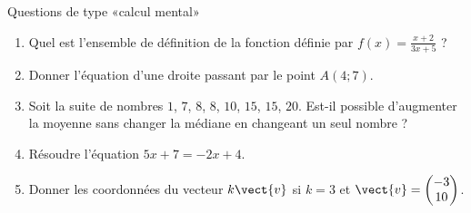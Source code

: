 
\begin{exercice}[\ldots/5]\label{exosmath-0714}

    Questions de type «calcul mental» 
    \begin{multicols}{2}
    \begin{enumerate}
        \item
            Quel est l'ensemble de définition de la fonction définie par \( f(x)=\frac{ x+2 }{ 3x+5 }\) ?
        \item
            Donner l'équation d'une droite passant par le point \( A(4;7)\).
        \item
            Soit la suite de nombres \( 1\), \( 7\), \( 8\), \( 8\), \( 10\), \( 15\), \( 15\), \( 20\). Est-il possible d'augmenter la moyenne sans changer la médiane en changeant un seul nombre ?
        \item
            Résoudre l'équation \( 5x+7=-2x+4\).
        \item
            Donner les coordonnées du vecteur \( k\vect{ v }\) si \( k=3\) et \( \vect{ v }=\begin{pmatrix}
                -3    \\ 
                10    
            \end{pmatrix}\).
    \end{enumerate}
    \end{multicols}

\end{exercice}
